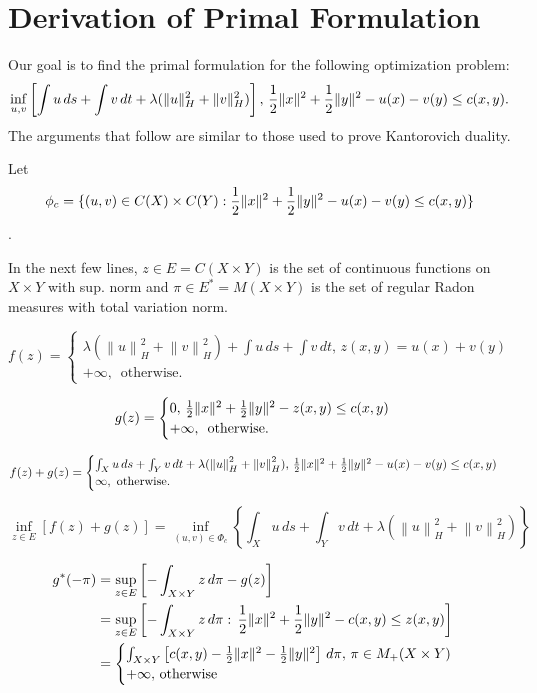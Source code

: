\section{Derivation of Primal Formulation}

Our goal is to find the primal formulation for the following optimization problem: 
$$ \inf_{u,v} \left[ \int u \, ds + \int v \, dt + \lambda (\lVert u\rVert_H^2 + \lVert v\rVert_H^2)\right],\, \frac{1}{2}\lVert x\rVert^2 + \frac{1}{2}\lVert y\rVert^2 - u(x) - v(y)\leq c(x,y). $$ The arguments that follow are similar to those used to prove Kantorovich duality.

Let $$\phi_c = \{ (u,v) \in C(X)\times C(Y): \frac{1}{2}\lVert x\rVert^2 + \frac{1}{2}\lVert y\rVert^2 - u(x) - v(y)\leq c(x,y)\}$$.

In the next few lines, $z \in E = C(X\times Y)$ is the set of continuous functions on $X\times Y$ with sup. norm and $\pi\in E^{*} = M(X\times Y)$ is the set of regular Radon measures with total variation norm.

$$f(z) = \begin{cases}
\lambda( \left\|u\right\|_H^2 + \left\|v\right\|_H^2) + \int u\,ds + \int v\,dt, \, z(x,y)=u(x)+v(y) \\
+\infty, \, \textrm{ otherwise.}
\end{cases}$$

$$g(z) = \begin{cases}
0, \, \frac{1}{2}\lVert x\rVert^2 + \frac{1}{2}\lVert y\rVert^2 - z(x,y)\leq c(x,y) \\
+\infty, \, \textrm{ otherwise.}
\end{cases}$$

$$f(z)+g(z) = \begin{cases}
\int_X u\,ds + \int_Y v\,dt + \lambda(\left\|u\right\|_H^2 + \left\|v\right\|_H^2), \, \frac{1}{2}\lVert x\rVert^2 + \frac{1}{2}\lVert y\rVert^2 - u(x) - v(y)\leq c(x,y) \\
\infty, \textrm{ otherwise.}
\end{cases}$$

$$\inf_{z\in E} [f(z)+g(z)] = \inf_{(u,v)\in \Phi_c} \left\{ \int_X u\,ds + \int_Y v\,dt + \lambda(\left\|u\right\|_H^2 + \left\|v\right\|_H^2) \right\}$$

\begin{align*}
g^{*}(-\pi) &= \sup_{z\in E} \left[ -\int_{X\times Y} z\,d\pi - g(z)\right] \\
&= \sup_{z\in E} \left[ - \int_{X\times Y} z\,d\pi :\, \frac{1}{2}\lVert x\rVert^2 + \frac{1}{2}\lVert y\rVert^2 - c(x,y)\leq z(x,y) \right] \\
&= \begin{cases}
\int_{X\times Y} \left[c(x,y) - \frac{1}{2}\lVert x\rVert^2 - \frac{1}{2}\lVert y\rVert^2\right] \,d\pi,\, \pi\in M_{+}(X\times Y) \\
+\infty, \, \textrm{otherwise}
\end{cases}
\end{align*}

